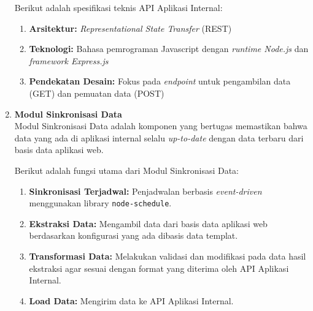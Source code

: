 \begin{enumerate}[label=\alph*.]
        Berikut adalah spesifikasi teknis API Aplikasi Internal:
        \begin{enumerate}[label=\arabic*.]
                
            \item \textbf{Arsitektur:} \textit{Representational State Transfer} (REST)
                    
            \item \textbf{Teknologi:} Bahasa pemrograman Javascript dengan \textit{runtime Node.js} dan \textit{framework Express.js}
                        
            \item \textbf{Pendekatan Desain:} Fokus pada \textit{endpoint} untuk pengambilan data (GET) dan pemuatan data (POST)
                    
        \end{enumerate}
            
    \item \textbf{Modul Sinkronisasi Data}\\
        Modul Sinkronisasi Data adalah komponen yang bertugas memastikan bahwa data yang ada di aplikasi internal selalu \textit{up-to-date} dengan data terbaru dari basis data aplikasi web.

        Berikut adalah fungsi utama dari Modul Sinkronisasi Data:
        \begin{enumerate}[label=\arabic*.]
                
            \item \textbf{Sinkronisasi Terjadwal:} Penjadwalan berbasis \textit{event-driven} menggunakan library \texttt{node-schedule}.
                    
            \item \textbf{Ekstraksi Data:} Mengambil data dari basis data aplikasi web berdasarkan konfigurasi yang ada dibasis data templat.
                    
            \item \textbf{Transformasi Data:} Melakukan validasi dan modifikasi pada data hasil ekstraksi agar sesuai dengan format yang diterima oleh API Aplikasi Internal.
                    
            \item \textbf{Load Data:} Mengirim data ke API Aplikasi Internal.
            \end{enumerate}


\end{enumerate}
